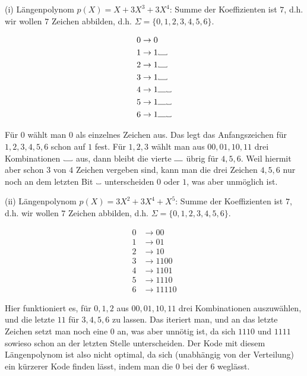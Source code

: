 (i) Längenpolynom $p(X) = X + 3X^{3} + 3X^{4}$:
Summe der Koeffizienten ist $7$, d.h. wir wollen $7$ Zeichen abbilden, d.h. $\Sigma = \{0,1,2,3,4,5,6\}$.

\begin{align*}
0 &\rightarrow 0 \\
1 &\rightarrow 1\Vtextvisiblespace[1em] \\
2 &\rightarrow 1\Vtextvisiblespace[1em] \\
3 &\rightarrow 1\Vtextvisiblespace[1em] \\
4 &\rightarrow 1\vbox{\hrule width 1em}\Vtextvisiblespace[0.5em] \\
5 &\rightarrow 1\vbox{\hrule width 1em}\Vtextvisiblespace[0.5em] \\
6 &\rightarrow 1\vbox{\hrule width 1em}\Vtextvisiblespace[0.5em]
\end{align*}

Für $0$ wählt man $0$ als einzelnes Zeichen aus. Das legt das Anfangszeichen für $1,2,3,4,5,6$ schon auf $1$ fest.
Für $1, 2, 3$ wählt man aus $00, 01, 10, 11$ drei Kombinationen $\Vtextvisiblespace[1em]$ aus, dann bleibt die vierte $\vbox{\hrule width 1em}$ übrig für
$4, 5, 6$. Weil hiermit aber schon $3$ von $4$ Zeichen vergeben sind, kann man die drei Zeichen $4, 5, 6$ nur noch
an dem letzten Bit $\Vtextvisiblespace[0.5em]$ unterscheiden $0$ oder $1$, was aber unmöglich ist.

(ii) Längenpolynom $p(X) = 3X^{2} + 3X^{4} + X^{5}$:
Summe der Koeffizienten ist $7$, d.h. wir wollen $7$ Zeichen abbilden, d.h. $\Sigma = \{0,1,2,3,4,5,6\}$.

\begin{align*}
0 &\rightarrow 00 \\
1 &\rightarrow 01 \\
2 &\rightarrow 10 \\
3 &\rightarrow 1100 \\
4 &\rightarrow 1101 \\
5 &\rightarrow 1110 \\
6 &\rightarrow 11110
\end{align*}

Hier funktioniert es, für $0, 1, 2$ aus $00, 01, 10, 11$ drei Kombinationen auszuwählen, und die letzte $11$ für $3, 4, 5, 6$
zu lassen. Das iteriert man, und an das letzte Zeichen setzt man noch eine $0$ an, was aber unnötig ist, da sich $1110$ und $1111$
sowieso schon an der letzten Stelle unterscheiden. Der Kode mit diesem Längenpolynom ist also nicht optimal, da sich
(unabhängig von der Verteilung) ein kürzerer Kode finden lässt, indem man die $0$ bei der $6$ weglässt.
